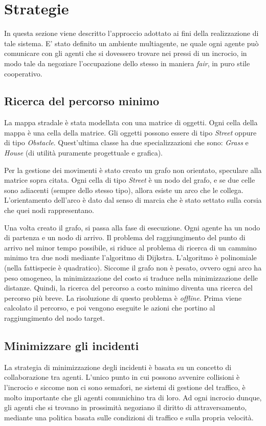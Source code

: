 \documentclass[a4paper,10pt]{article}
\begin{document}
	\section{Strategie}
    In questa sezione viene descritto l'approccio adottato ai fini della realizzazione
    di tale sistema. E' stato definito un ambiente multiagente, ne quale ogni agente
    può comunicare con gli agenti che si dovessero trovare nei pressi di un incrocio, in modo
    tale da negoziare l'occupazione dello stesso in maniera \emph{fair}, in puro stile
    cooperativo.
    
    \subsection{Ricerca del percorso minimo}
    La mappa stradale è stata modellata con una matrice di oggetti. Ogni cella
    della mappa è una cella della matrice. Gli oggetti possono essere di tipo
    \emph{Street} oppure di tipo \emph{Obstacle}. Quest'ultima classe ha due specializzazioni
    che sono: \emph{Grass} e \emph{House} (di utilità puramente progettuale e grafica).
    
    Per la gestione dei movimenti è stato creato un grafo non orientato, speculare
    alla matrice sopra citata. Ogni cella di tipo \emph{Street} è un nodo del grafo, e
    se due celle sono adiacenti (sempre dello stesso tipo), allora esiste un arco che le collega.
    L'orientamento dell'arco è dato dal senso di marcia che è stato settato sulla corsia che quei
    nodi rappresentano.
    
    Una volta creato il grafo, si passa alla fase di esecuzione. Ogni agente ha un nodo di partenza
    e un nodo di arrivo. Il problema del raggiungimento del punto di arrivo nel minor tempo possibile,
    si riduce al problema di ricerca di un cammino minimo tra due nodi mediante l'algoritmo di Dijkstra.
    L'algoritmo è polinomiale (nella fattispecie è quadratico). 
    Siccome il grafo non è pesato, ovvero ogni arco ha peso omogeneo, la minimizzazione del costo si traduce
    nella minimizzazione delle distanze. Quindi, la ricerca del percorso a costo minimo diventa una ricerca del
    percorso più breve. La risoluzione di questo problema è \emph{offline}. Prima viene calcolato il percorso, e poi
    vengono eseguite le azioni che portino al raggiungimento del nodo target.
    
    \subsection{Minimizzare gli incidenti}
    La strategia di minimizzazione degli incidenti è basata su un concetto di
    collaborazione tra agenti. L'unico punto in cui possono
    avvenire collisioni è l'incrocio e siccome non ci
    sono semafori, ne sistemi di gestione del traffico, è molto importante che
    gli agenti comunichino tra di loro. Ad ogni incrocio dunque, gli agenti che si trovano in
    prossimità negoziano il diritto di attraversamento, mediante una politica basata sulle
    condizioni di traffico e sulla propria velocità.
    
\end{document}

